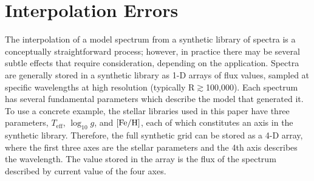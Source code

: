 \documentclass[iop,floatfix]{emulateapj}
\newcommand{\Z}{[{\rm Fe}/{\rm H}]}
\newcommand{\comm}[1]{ \textcolor{red}{SA: #1}}
\begin{document}


%




\appendix

\section{Interpolation Errors}
The interpolation of a model spectrum from a synthetic library of spectra is a conceptually straightforward process; however, in practice there may be several subtle effects that require consideration, depending on the application. Spectra are generally stored in a synthetic library as 1-D arrays of flux values, sampled at specific wavelengths at high resolution (typically R$\gtrsim$100,000). Each spectrum has several fundamental parameters which describe the model that generated it. To use a concrete example, the stellar libraries used in this paper have three parameters, $T_\textrm{eff}$, $\log_{10} g$, and $\Z$, each of which constitutes an axis in the synthetic library. Therefore, the full synthetic grid can be stored as a 4-D array, where the first three axes are the stellar parameters and the 4th axis describes the wavelength. The value stored in the array is the flux of the spectrum described by current value of the four axes.
\end{document}
